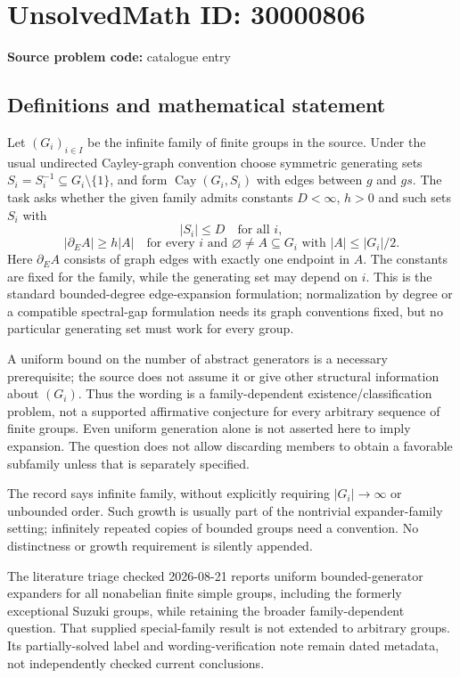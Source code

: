 \documentclass[11pt]{article}
\begin{document}
\section*{UnsolvedMath ID: 30000806}
\textbf{Source problem code:} catalogue entry
\subsection{Definitions and mathematical statement}
Let \((G_i)_{i\in I}\) be the infinite family of finite groups in the source. Under the usual undirected Cayley-graph convention choose symmetric generating sets \(S_i=S_i^{-1}\subseteq G_i\setminus\{1\}\), and form \(\operatorname{Cay}(G_i,S_i)\) with edges between \(g\) and \(gs\). The task asks whether the given family admits constants \(D<\infty\), \(h>0\) and such sets \(S_i\) with
\[
 |S_i|\leq D\quad\text{for all }i,
\]
\[
 |\partial_E A|\geq h|A|
 \quad\text{for every }i\text{ and }\varnothing\ne A\subseteq G_i
 \text{ with }|A|\leq|G_i|/2.
\]
Here \(\partial_E A\) consists of graph edges with exactly one endpoint in \(A\). The constants are fixed for the family, while the generating set may depend on \(i\). This is the standard bounded-degree edge-expansion formulation; normalization by degree or a compatible spectral-gap formulation needs its graph conventions fixed, but no particular generating set must work for every group.

A uniform bound on the number of abstract generators is a necessary prerequisite; the source does not assume it or give other structural information about \((G_i)\). Thus the wording is a family-dependent existence/classification problem, not a supported affirmative conjecture for every arbitrary sequence of finite groups. Even uniform generation alone is not asserted here to imply expansion. The question does not allow discarding members to obtain a favorable subfamily unless that is separately specified.

The record says infinite family, without explicitly requiring \(|G_i|\to\infty\) or unbounded order. Such growth is usually part of the nontrivial expander-family setting; infinitely repeated copies of bounded groups need a convention. No distinctness or growth requirement is silently appended.

The literature triage checked 2026-08-21 reports uniform bounded-generator expanders for all nonabelian finite simple groups, including the formerly exceptional Suzuki groups, while retaining the broader family-dependent question. That supplied special-family result is not extended to arbitrary groups. Its partially-solved label and wording-verification note remain dated metadata, not independently checked current conclusions.
\end{document}
